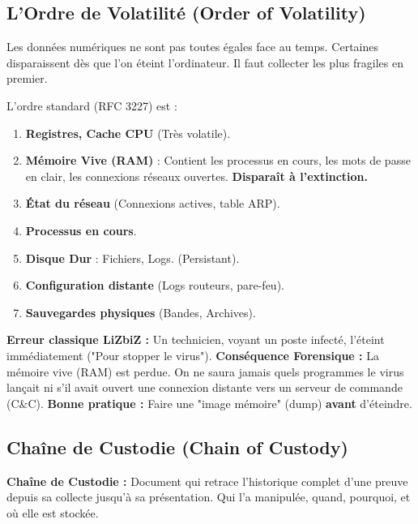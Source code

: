 \subsection{L'Ordre de Volatilité (Order of Volatility)}

Les données numériques ne sont pas toutes égales face au temps. Certaines disparaissent dès que l'on éteint l'ordinateur. Il faut collecter les plus fragiles en premier.

L'ordre standard (RFC 3227) est :
\begin{enumerate}
    \item \textbf{Registres, Cache CPU} (Très volatile).
    \item \textbf{Mémoire Vive (RAM)} : Contient les processus en cours, les mots de passe en clair, les connexions réseaux ouvertes. \textbf{Disparaît à l'extinction.}
    \item \textbf{État du réseau} (Connexions actives, table ARP).
    \item \textbf{Processus en cours}.
    \item \textbf{Disque Dur} : Fichiers, Logs. (Persistant).
    \item \textbf{Configuration distante} (Logs routeurs, pare-feu).
    \item \textbf{Sauvegardes physiques} (Bandes, Archives).
\end{enumerate}

\begin{boxlizbiz}
\textbf{Erreur classique LiZbiZ :}
Un technicien, voyant un poste infecté, l'éteint immédiatement ("Pour stopper le virus").
\textbf{Conséquence Forensique :} La mémoire vive (RAM) est perdue. On ne saura jamais quels programmes le virus lançait ni s'il avait ouvert une connexion distante vers un serveur de commande (C\&C).
\textbf{Bonne pratique :} Faire une "image mémoire" (dump) \textbf{avant} d'éteindre.
\end{boxlizbiz}

\subsection{Chaîne de Custodie (Chain of Custody)}

\begin{boxdef}
\textbf{Chaîne de Custodie :} Document qui retrace l'historique complet d'une preuve depuis sa collecte jusqu'à sa présentation. Qui l'a manipulée, quand, pourquoi, et où elle est stockée.
\end{boxdef}

